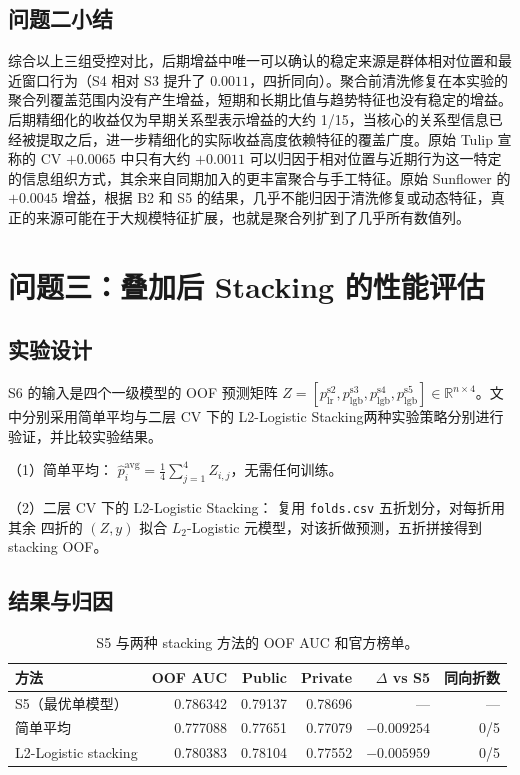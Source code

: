 \documentclass[12pt,UTF8,fontset=windows]{ctexart}
\begin{document}
\subsection{问题二小结}

综合以上三组受控对比，后期增益中唯一可以确认的稳定来源是群体相对位置和最近窗口行为（S4 相对 S3 提升了 $0.0011$，四折同向）。聚合前清洗修复在本实验的聚合列覆盖范围内没有产生增益，短期和长期比值与趋势特征也没有稳定的增益。后期精细化的收益仅为早期关系型表示增益的大约 1/15，当核心的关系型信息已经被提取之后，进一步精细化的实际收益高度依赖特征的覆盖广度。原始 Tulip 宣称的 CV $+0.0065$ 中只有大约 $+0.0011$ 可以归因于相对位置与近期行为这一特定的信息组织方式，其余来自同期加入的更丰富聚合与手工特征。原始 Sunflower 的 $+0.0045$ 增益，根据 B2 和 S5 的结果，几乎不能归因于清洗修复或动态特征，真正的来源可能在于大规模特征扩展，也就是聚合列扩到了几乎所有数值列。

\section{问题三：叠加后 Stacking 的性能评估}

\subsection{实验设计}

S6 的输入是四个一级模型的 OOF 预测矩阵
$Z = [p_{\text{lr}}^{\text{s2}}, p_{\text{lgb}}^{\text{s3}}, p_{\text{lgb}}^{\text{s4}},
p_{\text{lgb}}^{\text{s5}}] \in \mathbb{R}^{n\times4}$。文中分别采用简单平均与二层 CV 下的 L2-Logistic Stacking两种实验策略分别进行验证，并比较实验结果。

（1）简单平均： $\hat p_i^{\text{avg}} = \frac{1}{4}\sum_{j=1}^4 Z_{i,j}$，无需任何训练。

（2）二层 CV 下的 L2-Logistic Stacking： 复用 \texttt{folds.csv} 五折划分，对每折用其余
四折的 $(Z,y)$ 拟合 $L_2$-Logistic 元模型，对该折做预测，五折拼接得到 stacking OOF。

\subsection{结果与归因}

\begin{table}[h]
\centering\small
\caption{S5 与两种 stacking 方法的 OOF AUC 和官方榜单。}\label{tab:rq3-stages}
\setlength{\tabcolsep}{3pt}
\begin{tabular}{lrrrrr}
\toprule
方法 & OOF AUC & Public & Private & $\Delta$ vs S5 & 同向折数 \\
\midrule
S5（最优单模型）          & 0.786342 & 0.79137 & 0.78696 & ---           & --- \\
简单平均                  & 0.777088 & 0.77651 & 0.77079 & $-0.009254$   & 0/5 \\
L2-Logistic stacking      & 0.780383 & 0.78104 & 0.77552 & $-0.005959$   & 0/5 \\
\bottomrule
\end{tabular}
\end{table}
\end{document}
